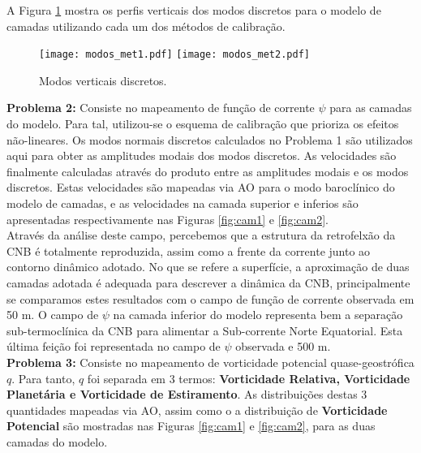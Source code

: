 \documentclass[12pt,portuguese,a4paper,pdftex]{article}
\renewcommand{\baselinestretch}{1.5}
\begin{document}
\vspace{.5cm}

A Figura \ref{fig:modos} mostra os perfis verticais dos modos discretos para o modelo de camadas utilizando cada um dos métodos de calibração.\\

\begin{figure}[ht]
\begin{center}
\texttt{[image: modos\_met1.pdf]}
\texttt{[image: modos\_met2.pdf]}
\end{center}
\vspace{-0.5cm}
\renewcommand{\baselinestretch}{.5}
\caption{\label{fig:modos} \small{Modos verticais discretos.}}
\end{figure}

\newpage

{\bf Problema 2:} Consiste no mapeamento de função de corrente $\psi$ para as camadas do modelo. Para tal, utilizou-se o esquema de calibração que prioriza os efeitos não-lineares. Os modos normais discretos calculados no Problema 1 são utilizados aqui para obter as amplitudes modais dos modos discretos. As velocidades são finalmente calculadas através do produto entre as amplitudes modais e os modos discretos. Estas velocidades são mapeadas via AO para o modo baroclínico do modelo de camadas, e as velocidades na camada superior e inferios são apresentadas respectivamente nas Figuras \ref{fig:cam1} e \ref{fig:cam2}. \\

Através da análise deste campo, percebemos que a estrutura da retrofelxão da CNB é totalmente reproduzida, assim como a frente da corrente junto ao contorno dinâmico adotado. No que se refere a superfície, a aproximação de duas camadas adotada é adequada para descrever a dinâmica da CNB, principalmente se comparamos estes resultados com o campo de função de corrente observada em 50 m. O campo de $\psi$ na camada inferior do modelo representa bem a separação sub-termoclínica da CNB para alimentar a Sub-corrente Norte Equatorial. Esta última feição foi representada no campo de $\psi$ observada e 500 m. \\

\textbf{Problema 3:} Consiste no mapeamento de vorticidade potencial quase-geostrófica $q$. Para tanto, $q$ foi separada em 3 termos: {\bf Vorticidade Relativa, Vorticidade Planetária e Vorticidade de Estiramento}. As distribuições destas 3 quantidades mapeadas via AO, assim como o a distribuição de {\bf Vorticidade Potencial} são mostradas nas Figuras \ref{fig:cam1} e \ref{fig:cam2}, para as duas camadas do modelo.\\
\end{document}
